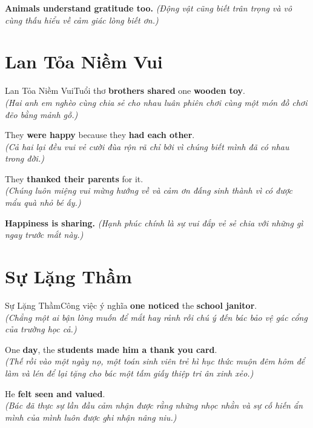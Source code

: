 \begin{baihoc}
  \textbf{Animals understand gratitude too.} \textit{(Động vật cũng biết trân trọng và vô cùng thấu hiểu về cảm giác lòng biết ơn.)}
\end{baihoc}

\vspace{0.8cm}

\ngayDay{}
\section{Lan Tỏa Niềm Vui}
\begin{truyen}{Lan Tỏa Niềm Vui}{Tuổi thơ}
 \textbf{brothers shared} one \textbf{wooden toy}.\\
\textit{(Hai anh em nghèo cùng chia sẻ cho nhau luân phiên chơi cùng một món đồ chơi đẽo bằng mảnh gỗ.)}

They \textbf{were happy} because they \textbf{had each other}.\\
\textit{(Cả hai lại đều vui vẻ cười đùa rộn rã chỉ bởi vì chúng biết mình đã có nhau trong đời.)}

They \textbf{thanked their parents} for it.\\
\textit{(Chúng luôn miệng vui mừng hướng về và cảm ơn đấng sinh thành vì có được mẩu quà nhỏ bé ấy.)}
\end{truyen}

\begin{baihoc}
  \textbf{Happiness is sharing.} \textit{(Hạnh phúc chính là sự vui đắp vẻ sẻ chia với những gì ngay trước mắt này.)}
\end{baihoc}

\vspace{0.8cm}

\ngayDay{}
\section{Sự Lặng Thầm}
\begin{truyen}{Sự Lặng Thầm}{Công việc ý nghĩa}
 \textbf{one noticed} the \textbf{school janitor}.\\
\textit{(Chẳng một ai bận lòng muốn để mắt hay rảnh rỗi chú ý đến bác bảo vệ gác cổng của trường học cả.)}

One \textbf{day}, the \textbf{students made him a thank you card}.\\
\textit{(Thế rồi vào một ngày nọ, một toán sinh viên trẻ hì hục thức muộn đêm hôm để làm và lén để lại tặng cho bác một tấm giấy thiệp tri ân xinh xẻo.)}

He \textbf{felt seen and valued}.\\
\textit{(Bác đã thực sự lần đầu cảm nhận được rằng những nhọc nhằn và sự cố hiến ẩn mình của mình luôn được ghi nhận nâng niu.)}
\end{truyen}


